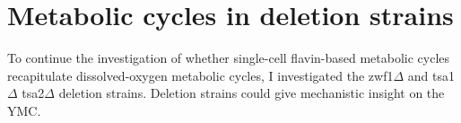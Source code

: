 \section{Metabolic cycles in deletion strains}
\label{sec:biology-deletions}


To continue the investigation of whether single-cell flavin-based metabolic cycles recapitulate dissolved-oxygen metabolic cycles, I investigated the zwf1$\Delta$ and tsa1$\Delta$ tsa2$\Delta$ deletion strains.
Deletion strains could give mechanistic insight on the YMC.



